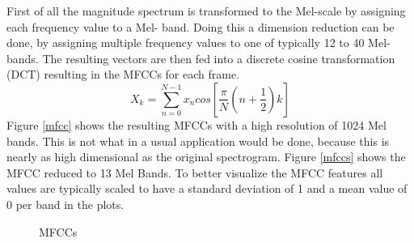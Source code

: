 \FloatBarrier
\noindent First of all the magnitude spectrum is transformed to the Mel-scale by assigning each frequency value to a Mel- band.
Doing this a dimension reduction can be done, by assigning multiple frequency values to one of typically 12 to 40 Mel-bands. The resulting vectors are then fed into a discrete cosine transformation (DCT) resulting in the MFCCs for each frame. 
\begin{equation} \label{eq:dct}
X_k = \sum_{n=0}^{N-1}{x_n cos\left[{\frac{\pi}{N}(n + \frac{1}{2})k}\right]}
\end{equation}
Figure \ref{mfcc} shows the resulting MFCCs with a high resolution of 1024 Mel bands. This is not what in a usual application would be done, because this is nearly as high dimensional as the original spectrogram. Figure \ref{mfccs} shows the MFCC reduced to 13 Mel Bands.
To better visualize the MFCC features all values are typically scaled to have a standard deviation of 1 and a mean value of 0 per band in the plots. 
\begin{figure}[htbp]
	\centering
	\caption{MFCCs}	
	\label{fig:mfcc}
\end{figure}
